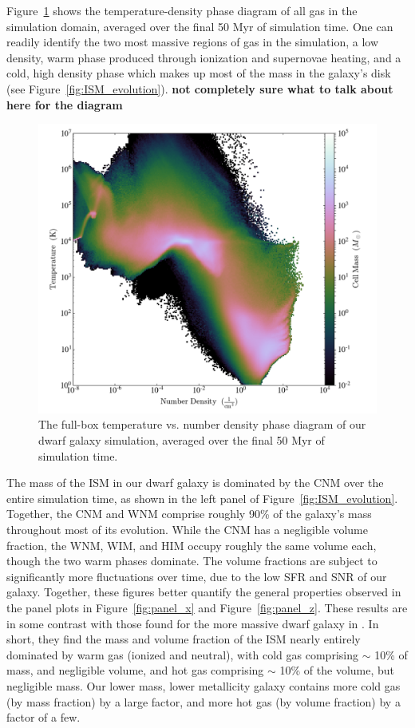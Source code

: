 \documentclass[twocolumn]{aastex61}
\begin{document}
Figure~\ref{fig:phase} shows the temperature-density phase diagram of all gas in the simulation domain, averaged over the final 50 Myr of simulation time. One can readily identify the two most massive regions of gas in the simulation, a low density, warm phase produced through ionization and supernovae heating, and a cold, high density phase which makes up most of the mass in the galaxy's disk (see Figure~\ref{fig:ISM_evolution}). \textbf{not completely sure what to talk about here for the diagram}

\begin{figure}
\centering
\includegraphics[width=0.95\linewidth]{phase_diagram.png}
\caption{The full-box temperature vs. number density phase diagram of our dwarf galaxy simulation, averaged over the final 50 Myr of simulation time.}
\label{fig:phase}
\end{figure} 

The mass of the ISM in our dwarf galaxy is dominated by the CNM over the entire simulation time, as shown in the left panel of Figure~\ref{fig:ISM_evolution}. Together, the CNM and WNM comprise roughly 90\% of the galaxy's mass throughout most of its evolution. While the CNM has a negligible volume fraction, the WNM, WIM, and HIM occupy roughly the same volume each, though the two warm phases dominate. The volume fractions are subject to significantly more fluctuations over time, due to the low SFR and SNR of our galaxy. Together, these figures better quantify the general properties observed in the panel plots in Figure~\ref{fig:panel_x} and Figure~\ref{fig:panel_z}. These results are in some contrast with those found for the more massive dwarf galaxy in \citet{Hu2016,Hu2017}. In short, they find the mass and volume fraction of the ISM nearly entirely dominated by warm gas (ionized and neutral), with cold gas comprising $\sim$ 10\% of mass, and negligible volume, and hot gas comprising $\sim$ 10\% of the volume, but negligible mass. Our lower mass, lower metallicity galaxy contains more cold gas (by mass fraction) by a large factor, and more hot gas (by volume fraction) by a factor of a few. 
\end{document}
